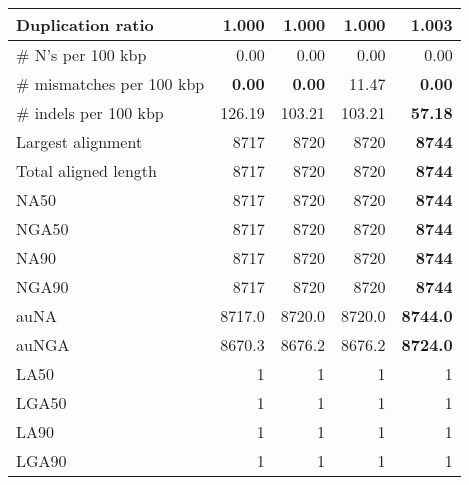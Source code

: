 \documentclass[12pt,a4paper]{article}
\begin{document}
\begin{table}[ht]
\begin{center}
\begin{tabular}{|l*{4}{|r}|}
Duplication ratio & {\bf 1.000} & {\bf 1.000} & {\bf 1.000} & 1.003 \\ \hline
\# N's per 100 kbp & 0.00 & 0.00 & 0.00 & 0.00 \\ \hline
\# mismatches per 100 kbp & {\bf 0.00} & {\bf 0.00} & 11.47 & {\bf 0.00} \\ \hline
\# indels per 100 kbp & 126.19 & 103.21 & 103.21 & {\bf 57.18} \\ \hline
Largest alignment & 8717 & 8720 & 8720 & {\bf 8744} \\ \hline
Total aligned length & 8717 & 8720 & 8720 & {\bf 8744} \\ \hline
NA50 & 8717 & 8720 & 8720 & {\bf 8744} \\ \hline
NGA50 & 8717 & 8720 & 8720 & {\bf 8744} \\ \hline
NA90 & 8717 & 8720 & 8720 & {\bf 8744} \\ \hline
NGA90 & 8717 & 8720 & 8720 & {\bf 8744} \\ \hline
auNA & 8717.0 & 8720.0 & 8720.0 & {\bf 8744.0} \\ \hline
auNGA & 8670.3 & 8676.2 & 8676.2 & {\bf 8724.0} \\ \hline
LA50 & 1 & 1 & 1 & 1 \\ \hline
LGA50 & 1 & 1 & 1 & 1 \\ \hline
LA90 & 1 & 1 & 1 & 1 \\ \hline
LGA90 & 1 & 1 & 1 & 1 \\ \hline
\end{tabular}
\end{center}
\end{table}
\end{document}
